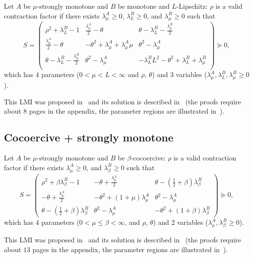 \documentclass[nonacm]{acmart}
\renewcommand{\leq}{\leqslant}
\renewcommand{\geq}{\geqslant}
\renewcommand{\succeq}{\succcurlyeq}
\begin{document}
Let $A$ be $\mu$-strongly monotone and $B$ be monotone and $L$-Lipschitz: $\rho$ is a valid contraction factor if there exists  $\lambda^A_\mu\geq 0$, $\lambda^B_L\geq 0$, and $\lambda^B_\mu\geq 0$ such that
\[ S= \begin{pmatrix}\rho ^2+\lambda^B_L-1 & \frac{\lambda^A_\mu}{2}-\theta  & \theta -\lambda^B_L-\frac{\lambda^B_\mu}{2} \\
 \frac{\lambda^A_\mu}{2}-\theta  & -\theta ^2+\lambda^A_\mu+\lambda^A_\mu \mu  & \theta ^2-\lambda^A_\mu \\
 \theta -\lambda^B_L-\frac{\lambda^B_\mu}{2} & \theta ^2-\lambda^A_\mu & -\lambda^B_L L^2-\theta ^2+\lambda^B_L+\lambda^B_\mu \\
\end{pmatrix}\succeq 0,
\]
which has 4 parameters ($0<\mu<L<\infty$ and $\rho$, $\theta$) and 3 variables ($\lambda^A_\mu,\lambda^B_L,\lambda^B_\mu\geq0$).

This LMI was proposed in~\cite[SM3.2.1]{ryu2020operator} and its solution is described in~\cite[Theorem 4.3]{ryu2020operator} (the proofs require about $8$ pages in the appendix, the parameter regions are illustrated in~\cite[Figure 4]{ryu2020operator}).

\subsection{Cocoercive + strongly monotone}
Let $A$ be $\mu$-strongly monotone and $B$ be $\beta$-cocoercive: $\rho$ is a valid contraction factor if there exists $\lambda^A_\mu\geq 0$, and $\lambda_\beta^B\geq 0$ such that
\[
S=\begin{pmatrix}
\rho ^2+\beta  \lambda_\beta^B-1 & -\theta+\frac{\lambda^A_\mu}{2}  & \theta -(\frac{1}{2}+\beta)\lambda_\beta^B \\
 -\theta+\frac{\lambda^A_\mu}{2}  & -\theta ^2+(1+\mu)\lambda^A_\mu  & \theta ^2-\lambda^A_\mu \\
 \theta -(\frac{1}{2}+\beta)\lambda_\beta^B & \theta ^2-\lambda^A_\mu & -\theta ^2+(1+\beta)\lambda_\beta^B 
\end{pmatrix}
\succeq 0,
\]
which has 4 parameters ($0< \mu\leq \beta<\infty$, and $\rho$, $\theta$) and 2 variables ($\lambda^A_\mu,\lambda_\beta^B\geq0$).

This LMI was proposed in~\cite[SM3.1.1.]{ryu2020operator} and its solution is described in~\cite[Theorem 4.1]{ryu2020operator} (the proofs require about $13$ pages in the appendix, the parameter regions are illustrated in~\cite[Figure 3]{ryu2020operator}).

{}

\end{document}
